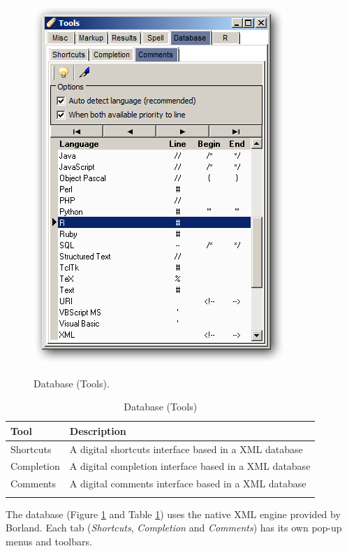 \begin{figure}[h!]
  \includegraphics[scale=0.35]{./res/tools_database_comments.png}\\
  \caption{Database (Tools).}
  \label{fig:tools_database_options}
\end{figure}

\begin{table}
  \begin{footnotesize}
    \begin{tabularx}{\textwidth}{>{\hsize=0.3\hsize}X>{\hsize=0.7\hsize}X}\\
      \hline
      \textbf{Tool} & \textbf{Description} \\
      \hline
      Shortcuts & A digital shortcuts interface based in a XML database \\
      Completion & A digital completion interface based in a XML database \\
      Comments & A digital comments interface based in a XML database \\
      \hline
      \\
    \end{tabularx}
  \end{footnotesize}
  \caption{Database (Tools)}
  \label{tab:tools_database_options}
\end{table}


The database
(Figure \ref{fig:tools_database_options} and
Table \ref{tab:tools_database_options})
uses the native XML engine provided by Borland. Each tab
(\textit{Shortcuts}, \textit{Completion} and
\textit{Comments}) has its own pop-up menus and toolbars.



